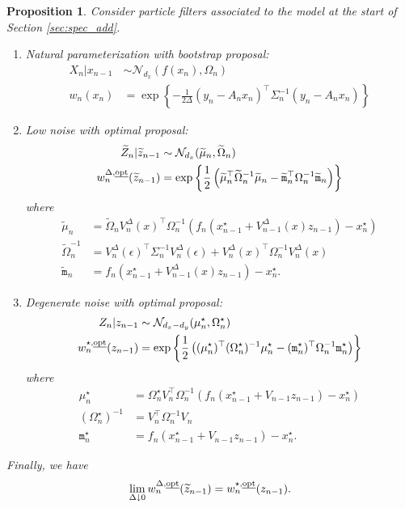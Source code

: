 \documentclass[english,13pt]{article}
\numberwithin{equation}{section}
\newtheorem{prop}{Proposition}[section]
\begin{document}
\begin{prop}\label{prop:prop}
Consider particle filters associated to the model at the start of Section \ref{sec:spec_add}.
\begin{enumerate}
\item{Natural parameterization with bootstrap proposal:
\begin{align*}
X_n | x_{n-1} & \sim \mathcal{N}_{d_x}(f(x_n),\Omega_n) \\
w_n(x_n) & = \exp\left\{-\frac{1}{2\Delta}(y_n-A_nx_n)^{\top}\Sigma_n^{-1}(y_n-A_nx_n)\right\}
\end{align*}
}
\item{Low noise with optimal proposal:
\begin{align*}
\widetilde{Z}_n|\widetilde{z}_{n-1} & \sim \mathcal{N}_{d_x}(\widetilde{\mu}_n,\widetilde{\Omega}_n) \\
w_n^{\Delta,\text{\emph{opt}}}(\widetilde{z}_{n-1}) & = \exp\left\{\frac{1}{2}
\left(\widetilde{\mu}_n^{\top}\widetilde{\Omega}_n^{-1}\widetilde{\mu}_n -
\widetilde{\mathtt{m}}_n^{\top}\Omega_n^{-1}\widetilde{\mathtt{m}}_n
\right)
\right\}
\end{align*}
where
\begin{align*}
\widetilde{\mu}_n & = \widetilde{\Omega}_nV_n^{\Delta}(x)^{\top}\Omega_n^{-1}(f_n(x_{n-1}^{\star}+V_{n-1}^{\Delta}(x)z_{n-1})-x_n^{\star})
\\
\widetilde{\Omega}_n^{-1} & =  V_n^{\Delta}(\epsilon)^{\top}\Sigma_n^{-1} V_n^{\Delta}(\epsilon) + 
 V_n^{\Delta}(x)^{\top}\Omega_n^{-1} V_n^{\Delta}(x) \\
\widetilde{\mathtt{m}}_n & = f_n(x_{n-1}^{\star}+V_{n-1}^{\Delta}(x)z_{n-1}) - x_n^{\star}.
\end{align*}
}
\item{Degenerate noise with optimal proposal:
\begin{align*}
Z_n|z_{n-1} & \sim \mathcal{N}_{d_x-d_y}(\mu_n^{\star},\Omega_n^{\star}) \\
w_n^{\star,\text{\emph{opt}}}(z_{n-1}) & = \exp\left\{\frac{1}{2}
\left((\mu_n^{\star})^{\top}(\Omega_n^{\star})^{-1}\mu_n^{\star} -
(\mathtt{m}_n^{\star})^{\top}\Omega_n^{-1}\mathtt{m}_n^{\star}
\right)
\right\}
\end{align*}
where
\begin{align*}
\mu_n^{\star} & = \Omega_n^{\star}V_n^{\top}\Omega_n^{-1}(f_n(x_{n-1}^{\star}+V_{n-1}z_{n-1})-x_n^{\star})
\\
(\Omega_n^{\star})^{-1} & =  
 V_n^{\top}\Omega_n^{-1} V_n \\
\mathtt{m}_n^{\star} & = f_n(x_{n-1}^{\star}+V_{n-1}z_{n-1}) - x_n^{\star}.
\end{align*}
}
\end{enumerate}
Finally,  we have
$$
\lim_{\Delta \downarrow 0}
w_n^{\Delta,\text{\emph{opt}}}(\widetilde{z}_{n-1}) = w_n^{\star,\text{\emph{opt}}}(z_{n-1}).
$$
\end{prop}
\end{document}
